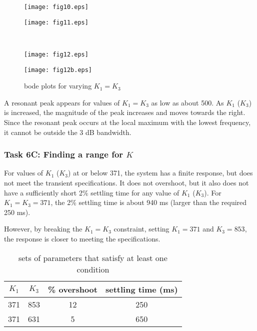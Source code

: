 \documentclass{article}
\begin{document}
\begin{figure}[H]\centering
  \caption{bode plots for varying $K_1 = K_3$}
  \begin{minipage}{9cm}
    \texttt{[image: fig10.eps]}
  \end{minipage}%
  \begin{minipage}{9cm}
    \texttt{[image: fig11.eps]}
  \end{minipage}\\
  \begin{minipage}{9cm}
    \texttt{[image: fig12.eps]}
  \end{minipage}%
  \begin{minipage}{9cm}
    \texttt{[image: fig12b.eps]}
  \end{minipage}
\end{figure}

A resonant peak appears for values of $K_1 = K_3$ as low as about 500.
As $K_1$ ($K_3$) is increased, the magnitude of the peak increases and
moves towards the right.  Since the resonant peak occurs at the local
maximum with the lowest frequency, it cannot be outside the 3 dB
bandwidth.

\subsubsection*{Task 6C: Finding a range for $K$}

For values of $K_1$ ($K_3$) at or below 371, the system has a finite
response, but does not meet the transient specifications.  It does not
overshoot, but it also does not have a sufficiently short 2\% settling
time for any value of $K_1$ ($K_3$).  For $K_1 = K_3 = 371$, the 2\%
settling time is about 940 ms (larger than the required 250 ms).

However, by breaking the $K_1 = K_3$ constraint, setting $K_1 = 371$
and $K_3 = 853$, the response is closer to meeting the specifications.

\begin{table}[H]
\begin{center}
  \begin{tabular}{ | c | c | c | c |}
  \hline
  $K_1$ & $K_3$ & \% overshoot & settling time (ms) \\ \hline
  371   &   853 &           12 &                250 \\ \hline
  371   &   631 &            5 &                650 \\ \hline
 \end{tabular}
\end{center}
\caption{sets of parameters that satisfy at least one condition}
\end{table}
\end{document}
